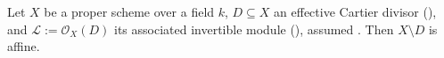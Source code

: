 \begin{lemma}
\label{lem:pcb-ample-complement-affine}
Let \(X\) be a proper scheme over a field \(k\), \(D\subseteq X\) an
effective Cartier divisor (),
and \(\mathcal L:=\mathcal O_X(D)\) its associated invertible module
(), assumed
.  Then \(X\setminus D\) is affine.
\end{lemma}
